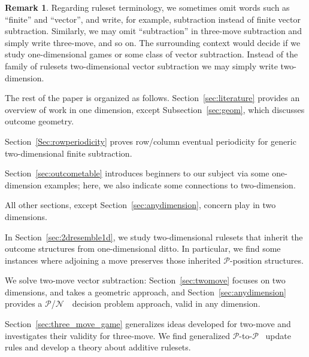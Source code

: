 \documentclass{amsart}
\theoremstyle{plain}
\theoremstyle{definition}
\newtheorem{rem}[thm]{Remark}
\newcommand{\N}{\ensuremath{\mathcal N}}
\renewcommand{\P}{\ensuremath{\mathcal P}}
\newcommand{\x}{\boldsymbol x}
\newcommand{\s}{\boldsymbol s}
\begin{document}


\begin{rem}\label{rem: notation}
Regarding ruleset terminology, we sometimes omit words such as ``finite'' and ``vector'', and write, for example, {\sc subtraction} instead of {\sc finite vector subtraction}.  Similarly, we may omit ``subtraction'' in {\sc three-move subtraction} and simply write {\sc three-move}, and so on. The surrounding context would decide if we study one-dimensional games or some class of {\sc vector subtraction}. Instead of the family of rulesets {\sc two-dimensional vector subtraction} we may simply write {\sc two-dimension}. 
\end{rem}

The rest of the paper is organized as follows. Section~\ref{sec:literature} provides an overview of work in one dimension, except Subsection~\ref{sec:geom}, which discusses outcome geometry. 

Section~\ref{Sec:rowperiodicity} proves row/column eventual periodicity for generic {\sc two-dimensional finite subtraction}.

Section~\ref{sec:outcometable} introduces beginners to our subject via some {\sc one-dimension} examples; here, we also indicate some connections to {\sc two-dimension}. 

All other sections, except Section~\ref{sec:anydimension}, concern play in two dimensions. 

In Section~\ref{sec:2dresemble1d}, we study two-dimensional rulesets that inherit the outcome structures from one-dimensional ditto. In particular, we find some instances where adjoining a move preserves those inherited \P-position structures. 


We solve {\sc two-move vector subtraction}:  Section~\ref{sec:twomove} focuses on two dimensions, and takes a geometric approach,  and Section~\ref{sec:anydimension} provides a \P/\N\ ~decision problem approach,  valid in any dimension. 

Section~\ref{sec:three_move_game}  generalizes ideas developed for {\sc two-move} and investigates their validity for {\sc three-move}. We find generalized \P-to-\P~ update rules and develop a theory about additive rulesets. 
\end{document}

